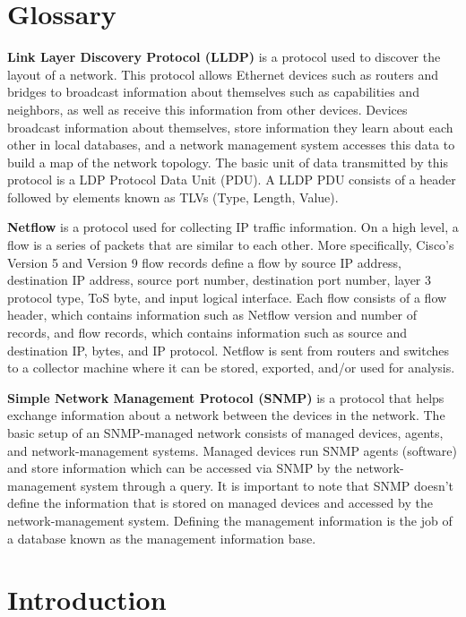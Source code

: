 \documentclass{sig-alternate}
\begin{document}
\section*{Glossary}

\textbf{Link Layer Discovery Protocol (LLDP)} is a protocol used to discover the
layout of a network.\cite{ExtremeNetLldp} This protocol allows Ethernet devices
such as routers and bridges to broadcast information about themselves such as
capabilities and neighbors, as well as receive this information from other
devices. Devices broadcast information about themselves, store information they
learn about each other in local databases, and a network management system
accesses this data to build a map of the network topology. The basic unit of
data transmitted by this protocol is a LDP Protocol Data Unit (PDU). A LLDP PDU
consists of a header followed by elements known as TLVs (Type, Length, Value).

\textbf{Netflow} is a protocol used for collecting IP
traffic information.\cite{SolarWindsGuide} On a high level, a flow is a series
of packets that are similar to each other. More specifically, Cisco's Version 5
and Version 9 flow records define a flow by source IP address, destination IP
address, source port number, destination port number, layer 3 protocol type, ToS
byte, and input logical interface. Each flow consists of a flow header, which
contains information such as Netflow version and number of records, and flow
records, which contains information such as source and destination IP, bytes,
and IP protocol. Netflow is sent from routers and switches to a collector
machine where it can be stored, exported, and/or used for analysis.

\textbf{Simple Network Management Protocol (SNMP)} is a protocol that helps
exchange information about a network between the devices in the
network.\cite{ZohoSnmp} The basic setup of an SNMP-managed network consists of
managed devices, agents, and network-management systems. Managed devices run
SNMP agents (software) and store information which can be accessed via SNMP by
the network-management system through a query. It is important to note that SNMP
doesn't define the information that is stored on managed devices and accessed by
the network-management system. Defining the management information is the job of
a database known as the management information base.

\section{Introduction}
\end{document}
